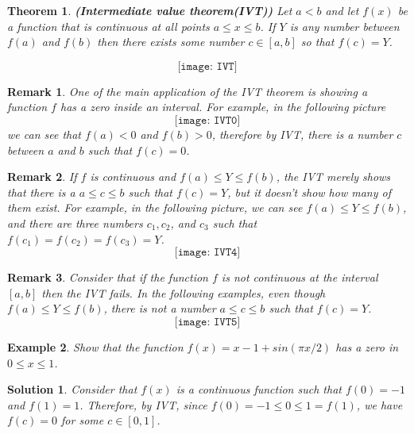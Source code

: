 \documentclass[12pt,a4paper]{book}
\newtheorem{theorem}{Theorem}[section]
\newtheorem{Example}[theorem]{Example}
\numberwithin{equation}{section}
\newtheorem*{solution}{{\bf Solution}}
\newtheorem*{remark}{Remark}
\begin{document}
\begin{tcolorbox}[width=\textwidth,colback={green!20},title={},colbacktitle=yellow,coltitle=blue]
\begin{theorem}{\bf (Intermediate value theorem(IVT))} 
	Let $a<b$ and let $f(x)$ be a function that is continuous at all points $a\leq x\leq b$. If ${Y}$ is any number between $f(a)$ and $f(b)$ then there exists some number $c\in [a,b]$ so that $f(c)={Y}$.
\end{theorem}

$$
\texttt{[image: IVT]}
$$
\end{tcolorbox}
\begin{remark}
One of the main application of the IVT theorem is showing a function $f$ has a zero inside an interval. For example, in the following picture
$$
\texttt{[image: IVT0]}
$$
we can see that $f(a)<0$ and $f(b)>0$, therefore by IVT, there is a number $c$ between $a$ and $b$ such that $f(c)=0$.

\end{remark}
\begin{remark}
If $f$ is continuous and $f(a) \leq Y \leq f(b)$, the IVT merely shows that there is a $a \leq c \leq b$ such that $f(c)=Y$, but it doesn't show how many of them exist. For example, in the following picture, we can see $f(a) \leq Y \leq f(b)$, and there are three numbers $c_1,c_2$, and $c_3$ such that $f(c_1)=f(c_2)=f(c_3)=Y$.
$$
\texttt{[image: IVT4]}
$$
\end{remark}

\begin{remark}
	Consider that if the function $f$ is not continuous at the interval $[a,b]$ then the IVT fails. In the following examples, even though $f(a)\leq Y\leq f(b)$, there is not a number $a \leq c\leq b$ such that $f(c)=Y$. 
	$$
	\texttt{[image: IVT5]}
	$$
\end{remark}
 
\begin{tcolorbox}[width=\textwidth,colback={green!20},title={},colbacktitle=yellow,coltitle=blue]
\begin{Example}
	Show that the function $f(x)=x-1+sin(\pi x /2)$ has a zero in $0\leq x \leq 1$.
\end{Example}

\begin{solution}
	Consider that $f(x)$ is a continuous function such  that $f(0)=-1$ and $f(1)=1$. Therefore, by IVT, since $f(0)=-1\leq 0 \leq 1 = f(1)$, we have $f(c)=0$ for some $c\in [0,1]$.
\end{solution}
\end{tcolorbox}
\end{document}
